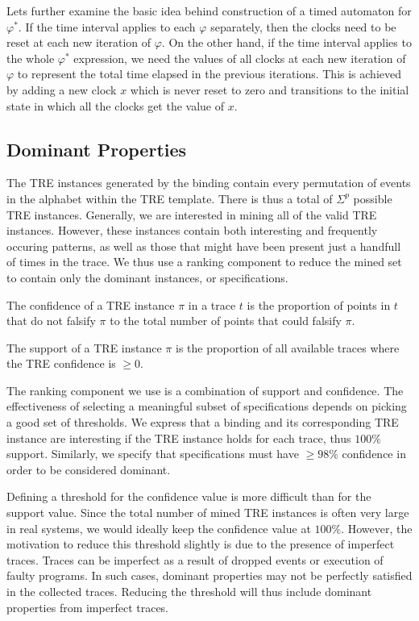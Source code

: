 \documentclass[]{sigplanconf}
\begin{document}
Lets further examine the basic idea behind construction of a timed automaton for $\varphi^*$. If the time interval applies to each $\varphi$ separately, then the clocks need to be reset at each new iteration of $\varphi$. On the other hand, if the time interval applies to the whole $\varphi^*$ expression, we need the values of all clocks at each new iteration of $\varphi$ to represent the total time elapsed in the previous iterations. This is achieved by adding a new clock $x$ which is never reset to zero and transitions to the initial state in which all the clocks get the value of $x$.


\subsection{Dominant Properties}

The TRE instances generated by the binding contain every permutation of events in the alphabet within the TRE template. There is thus a total of $\Sigma^p$ possible TRE instances. Generally, we are interested in mining all of the valid TRE instances.
However, these instances contain both interesting and frequently occuring patterns, as well as those that might have been present just a handfull of times in the trace. We thus use a ranking component to reduce the mined set to contain only the dominant instances, or specifications.



\begin{defns}[Confidence]
The confidence of a TRE instance $\pi$ in a trace $t$ is the proportion of points in $t$ that do not falsify $\pi$ to the total number of points that could falsify $\pi$.
\end{defns}

\begin{defns}[Support]
The support of a TRE instance $\pi$ is the proportion of all available traces where the TRE confidence is $\ge 0$.
\end{defns}


The ranking component we use is a combination of support and confidence. The effectiveness of selecting a meaningful subset of specifications depends on picking a good set of thresholds. We express that a binding and its corresponding TRE instance are interesting if the TRE instance holds for each trace, thus $100 \%$ support. Similarly, we specify that specifications must have $ \ge 98 \%$ confidence in order to be considered dominant.

Defining a threshold for the confidence value is more difficult than for the support value. Since the total number of mined TRE instances is often very large in real systems, we would ideally keep the confidence value at $100 \%$. However, the motivation to reduce this threshold slightly is due to the presence of imperfect traces. Traces can be imperfect as a result of dropped events or execution of faulty programs. In such cases, dominant properties may not be perfectly satisfied in the collected traces. Reducing the threshold will thus include dominant properties from imperfect traces.
\end{document}

